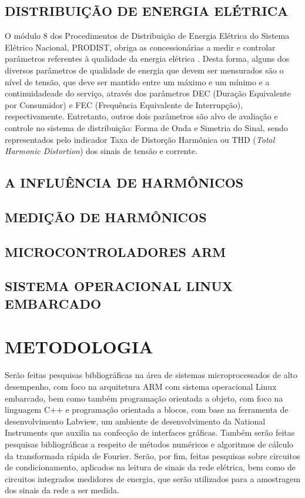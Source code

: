 \documentclass[
	12pt,				%
	openright,			%
	oneside,			%
	a4paper,			%
	chapter=TITLE,		%
	english,			%
	french,				%
	spanish,			%
	brazil,				%
	article,			%
	]{uea-abntex2}
\begin{document}
\subsection{DISTRIBUIÇÃO DE ENERGIA ELÉTRICA}
\hspace*{0.8cm}O módulo 8 dos Procedimentos de Distribuição de Energia Elétrica
do Sistema Elétrico Nacional, PRODIST, obriga as concessionárias a medir e
controlar parâmetros referentes à qualidade da energia elétrica \cite{PRODIST}.
Desta forma, alguns dos diversos parâmetros de qualidade de energia que devem
ser mensurados são o nível de tensão, que deve ser mantido entre um máximo e um
mínimo e a continuidadeade do serviço, através dos parâmetros DEC (Duração
Equivalente por Consumidor) e FEC (Frequência Equivalente de Interrupção),
respectivamente. Entretanto, outros dois parâmetros são alvo de avaliação e
controle no sistema de distribuição: Forma de Onda e Simetria do Sinal, sendo
representados pelo indicador Taxa de Distorção Harmônica ou THD (\textit{Total
Harmonic Distortion}) dos sinais de tensão e corrente.

\subsection{A INFLUÊNCIA DE HARMÔNICOS}

\subsection{MEDIÇÃO DE HARMÔNICOS}

\subsection{MICROCONTROLADORES ARM}

\subsection{SISTEMA OPERACIONAL LINUX EMBARCADO}

\section{METODOLOGIA}

\hspace*{0.8cm}Serão feitas pesquisas bibliográficas na área de sistemas microprocessados de alto desempenho, com foco na arquitetura ARM com sistema operacional Linux embarcado, bem como também programação orientada a objeto, com foco na linguagem C++ e programação orientada a blocos, com base na ferramenta de desenvolvimento Labview, um ambiente de desenvolvimento da National Instruments que auxilia na confecção de interfaces gráficas. Também serão feitas pesquisas bibliográficas a respeito de métodos numéricos e algoritmos de cálculo da transformada rápida de Fourier. Serão, por fim, feitas pesquisas sobre circuitos de condicionamento, aplicados na leitura de sinais da rede elétrica, bem como de circuitos integrados medidores de energia, que serão utilizados para a amostragem dos sinais da rede a ser medida.
\end{document}
